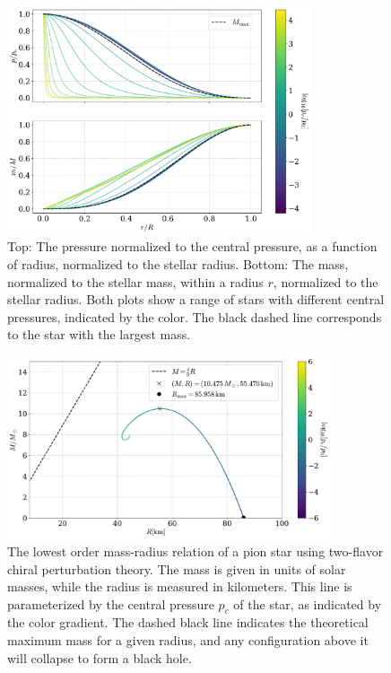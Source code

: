 \begin{figure}[!htb]
    \centering
    \includegraphics[width=0.8\textwidth]{../scripts/figurer/pion_star/pressure_mass_pion_star.pdf}
    \caption{
    Top: The pressure normalized to the central pressure, as a function of radius, normalized to the stellar radius.
    Bottom: The mass, normalized to the stellar mass, within a radius $r$, normalized to the stellar radius.
    Both plots show a range of stars with different central pressures, indicated by the color.
    The black dashed line corresponds to the star with the largest mass.
    }
    \label{fig: pressure and mass for pion star}
\end{figure}

\begin{figure}[!htb]
    \centering
    \includegraphics[width=0.85\textwidth]{../scripts/figurer/pion_star/mass_radius_pion_star.pdf}
    \caption{
        The lowest order mass-radius relation of a pion star using two-flavor chiral perturbation theory.
        The mass is given in units of solar masses, while the radius is measured in kilometers.
        This line is parameterized by the central pressure $p_c$ of the star, as indicated by the color gradient.
        The dashed black line indicates the theoretical maximum mass for a given radius, and any configuration above it will collapse to form a black hole.
        }
        \label{fig: mass-radius relation pion star}
\end{figure}

